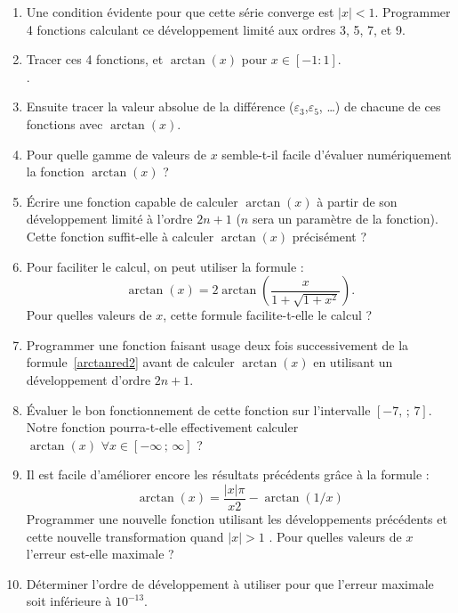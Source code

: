 \begin{enumerate}
\item  Une  condition  évidente  pour que  cette  série  converge  est
  $|x|<1$.  Programmer  4 fonctions calculant ce  développement limité
  aux ordres 3, 5, 7, et 9.
\item  Tracer   ces  4   fonctions,  et   $\arctan(x)$  pour   $x  \in
  [-1:1]$.\\ .
\item   Ensuite   tracer   la   valeur  absolue   de   la   différence
  ($\varepsilon_3$,$\varepsilon_5$, \dots) de chacune de ces fonctions
  avec $\arctan(x)$.
\item Pour quelle gamme de valeurs de $x$ semble-t-il facile d'évaluer
  numériquement la fonction $\arctan(x)$ ?
\item Écrire une fonction capable de calculer $\arctan(x)$ à partir de
  son développement limité à l'ordre  $2n+1$ ($n$ sera un paramètre de
  la fonction).   Cette fonction  suffit-elle à  calculer $\arctan(x)$
  précisément ?
\item Pour faciliter le calcul, on peut utiliser la formule :
  \begin{equation}\label{arctanred2}
    \arctan(x) = 2 \arctan\left(\frac{x}{1+\sqrt{1+x^2}}\right).
  \end{equation}
  Pour quelles valeurs de $x$, cette formule facilite-t-elle le calcul
  ?
\item Programmer  une fonction faisant usage  deux fois successivement
  de  la formule~\ref{arctanred2}  avant de  calculer $\arctan(x)$  en
  utilisant un développement d'ordre $2n+1$.
\item Évaluer le bon fonctionnement de cette fonction sur 
  l'intervalle $[-7,\,;\,7]$. Notre fonction pourra-t-elle effectivement 
  calculer $\arctan(x) \,\, \forall x \in [-\infty\,;\,\infty]$ ?
\item Il est facile d'améliorer encore les résultats précédents 
  grâce à la formule : 
\begin{equation}
\arctan(x) = \frac{|x|\pi}{x2}-\arctan(1/x) 
\end{equation}
Programmer une nouvelle fonction utilisant les développements précédents et
cette nouvelle transformation quand $|x|>1$ . Pour 
quelles valeurs de $x$ l'erreur est-elle maximale ? 
\item Déterminer l'ordre de développement à utiliser pour que 
l'erreur maximale soit inférieure à $10^{-13}$.
\end{enumerate}


